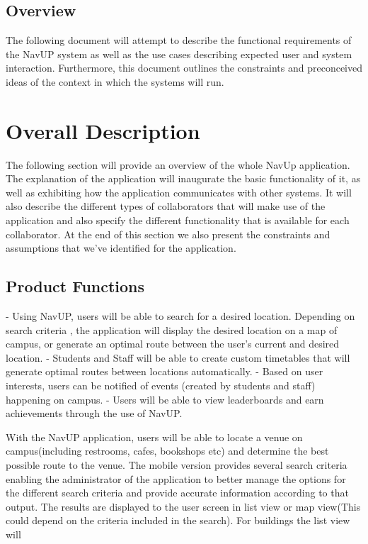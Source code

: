 \documentclass[12pt]{article}
\begin{document}
	\subsection{Overview}
		The following document will attempt to describe the functional requirements of the NavUP system as well as the use cases describing expected user and system interaction. Furthermore, this document outlines the constraints and preconceived ideas of the context in which the systems will run.
	\section{Overall Description}	
	The following section will provide an overview of the whole NavUp application. The explanation of the application will inaugurate the basic functionality of it, as well as exhibiting how the application communicates with other systems. It will also describe the different types of collaborators that will make use of the application and also specify the different functionality that is available for each collaborator. At the end of this section we also present the constraints and assumptions that we've identified for the application. 
	\subsection{Product Functions}

	- Using NavUP, users will be able to search for a desired location. Depending on search criteria , the application will display the desired location on a map of campus, or generate an optimal route between the user's current and desired location. 
	- Students and Staff will be able to create custom timetables that will generate optimal routes between locations automatically.
	- Based on user interests, users can be notified of events (created by students and staff) happening on campus.
	- Users will be able to view leaderboards and earn achievements through the use of NavUP.
  
	With the NavUP application, users will be able to locate a venue on campus(including restrooms, cafes, bookshops etc) and determine the best possible route to the venue. The mobile version provides several search criteria enabling the administrator of the application to better manage the options for the different search criteria and provide accurate information according to that output. The results are displayed to the user screen in list view or map view(This could depend on the criteria included in the search). For buildings the list view will 
	
\end{document}
